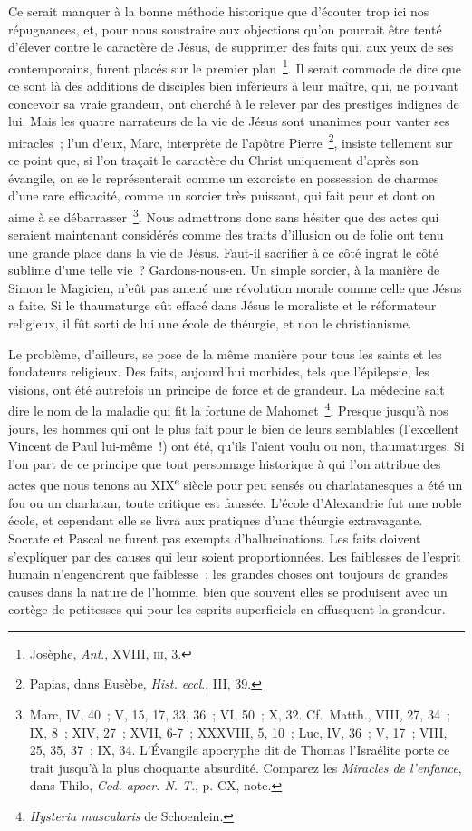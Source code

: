 \documentclass[french,twoside]{book} %
\begin{document}
Ce serait manquer à la bonne méthode historique que d’écouter trop ici nos répugnances, et, pour nous soustraire aux objections qu’on pourrait être tenté d’élever contre le caractère de Jésus, de supprimer des faits qui, aux yeux de ses contemporains, furent placés sur le premier plan \footnote{ Josèphe, {\itshape Ant}., XVIII, \textsc{iii}, 3.}. Il serait commode de dire que ce sont là des additions de disciples bien inférieurs à leur maître, qui, ne pouvant concevoir sa vraie grandeur, ont cherché à le relever par des prestiges indignes de lui. Mais les quatre narrateurs de la vie de Jésus sont unanimes pour vanter ses miracles ; l’un d’eux, Marc, interprète de l’apôtre Pierre \footnote{ Papias, dans Eusèbe, {\itshape Hist. eccl}., III, 39.}, insiste tellement sur ce point que, si l’on traçait le caractère du Christ uniquement d’après son évangile, on se le représenterait comme un exorciste en possession de charmes d’une rare efficacité, comme un sorcier très puissant, qui fait peur et dont on aime à se débarrasser \footnote{ Marc, IV, 40 ; V, 15, 17, 33, 36 ; VI, 50 ; X, 32. Cf. Matth., VIII, 27, 34 ; IX, 8 ; XIV, 27 ; XVII, 6-7 ; XXXVIII, 5, 10 ; Luc, IV, 36 ; V, 17 ; VIII, 25, 35, 37 ; IX, 34. L’Évangile apocryphe dit de Thomas l’Israélite porte ce trait jusqu’à la plus choquante absurdité. Comparez les {\itshape Miracles de l’enfance}, dans Thilo, {\itshape Cod. apocr. N. T}., p. CX, note.}. Nous admettrons donc sans hésiter que des actes qui seraient maintenant considérés comme des traits d’illusion ou de folie ont tenu une grande place dans la vie de Jésus. Faut-il sacrifier à ce côté ingrat le côté sublime d’une telle vie ? Gardons-nous-en. Un simple sorcier, à la manière de Simon le Magicien, n’eût pas amené une révolution morale comme celle que Jésus a faite. Si le thaumaturge eût effacé dans Jésus le moraliste et le réformateur religieux, il fût sorti de lui une école de théurgie, et non le christianisme.\par
Le problème, d’ailleurs, se pose de la même manière pour tous les saints et les fondateurs religieux. Des faits, aujourd’hui morbides, tels que l’épilepsie, les visions, ont été autrefois un principe de force et de grandeur. La médecine sait dire le nom de la maladie qui fit la fortune de Mahomet \footnote{{\itshape Hysteria muscularis} de Schoenlein.}. Presque jusqu’à nos jours, les hommes qui ont le plus fait pour le bien de leurs semblables (l’excellent Vincent de Paul lui-même !) ont été, qu’ils l’aient voulu ou non, thaumaturges. Si l’on part de ce principe que tout personnage historique à qui l’on attribue des actes que nous tenons au XIX\textsuperscript{e} siècle pour peu sensés ou charlatanesques a été un fou ou un charlatan, toute critique est faussée. L’école d’Alexandrie fut une noble école, et cependant elle se livra aux pratiques d’une théurgie extravagante. Socrate et Pascal ne furent pas exempts d’hallucinations. Les faits doivent s’expliquer par des causes qui leur soient proportionnées. Les faiblesses de l’esprit humain n’engendrent que faiblesse ; les grandes choses ont toujours de grandes causes dans la nature de l’homme, bien que souvent elles se produisent avec un cortège de petitesses qui pour les esprits superficiels en offusquent la grandeur.\par
\end{document}
